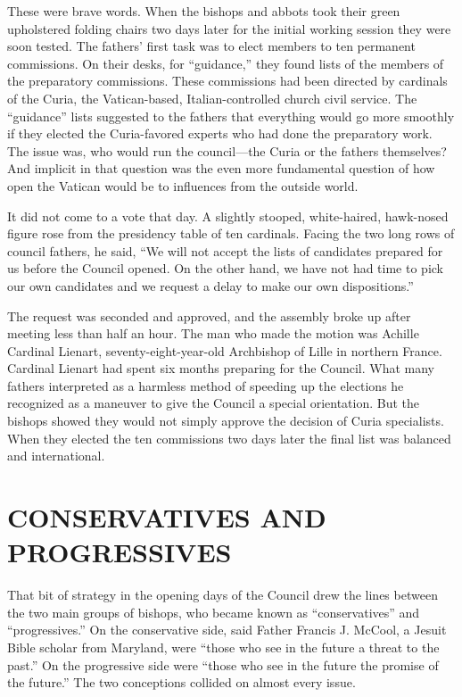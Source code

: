 These were brave words. When the bishops and abbots took their green upholstered folding chairs two
days later for the initial working session they were soon tested. The fathers’ first task was to
elect members to ten permanent commissions. On their desks, for “guidance,” they found lists of the
members of the preparatory commissions. These commissions had been directed by cardinals of the
Curia, the Vatican-based, Italian-controlled church civil service. The “guidance” lists suggested to
the fathers that everything would go more smoothly if they elected the Curia-favored experts who had
done the preparatory work. The issue was, who would run the council—the Curia or the fathers
themselves? And implicit in that question was the even more fundamental question of how open the
Vatican would be to influences from the outside world.

It did not come to a vote that day. A slightly stooped, white-haired, hawk-nosed figure rose from
the presidency table of ten cardinals. Facing the two long rows of council fathers, he said, “We
will not accept the lists of candidates prepared for us before the Council opened. On the other
hand, we have not had time to pick our own candidates and we request a delay to make our own
dispositions.”

The request was seconded and approved, and the assembly broke up after meeting less than half an
hour. The man who made the motion was Achille Cardinal Lienart, seventy-eight-year-old Archbishop of
Lille in northern France. Cardinal Lienart had spent six months preparing for the Council. What many
fathers interpreted as a harmless method of speeding up the elections he recognized as a maneuver to
give the Council a special orientation. But the bishops showed they would not simply approve the
decision of Curia specialists. When they elected the ten commissions two days later the final list
was balanced and international.

\section{CONSERVATIVES AND PROGRESSIVES}

That bit of strategy in the opening days of the Council drew the lines between the two main groups
of bishops, who became known as “conservatives” and “progressives.” On the conservative side, said
Father Francis J. McCool, a Jesuit Bible scholar from Maryland, were “those who see in the future a
threat to the past.” On the progressive side were “those who see in the future the promise of the
future.” The two conceptions collided on almost every issue.

